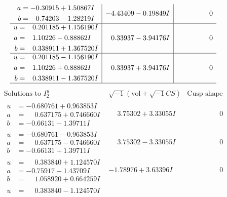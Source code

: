 \documentclass[1p]{elsarticle_modified}
\theoremstyle{definition}
\newcommand{\I}{\sqrt{-1}}
\begin{document}
$$\begin{array}{c|c|c}
\begin{aligned}
a &= -0.30915 + 1.50867 I \\
b &= -0.74203 - 1.28219 I\end{aligned}
 & -4.43409 - 0.19849 I & \phantom{-0.000000 } 0 \\ \hline\begin{aligned}
u &= \phantom{-}0.201185 + 1.156190 I \\
a &= \phantom{-}1.10226 - 0.88862 I \\
b &= \phantom{-}0.338911 + 1.367520 I\end{aligned}
 & \phantom{-}0.33937 - 3.94176 I & \phantom{-0.000000 } 0 \\ \hline\begin{aligned}
u &= \phantom{-}0.201185 - 1.156190 I \\
a &= \phantom{-}1.10226 + 0.88862 I \\
b &= \phantom{-}0.338911 - 1.367520 I\end{aligned}
 & \phantom{-}0.33937 + 3.94176 I & \phantom{-0.000000 } 0\\
 \hline 
 \end{array}$$\newpage$$\begin{array}{c|c|c}  
\text{Solutions to }I^u_{2}& \I (\text{vol} + \sqrt{-1}CS) & \text{Cusp shape}\\
 \hline 
\begin{aligned}
u &= -0.680761 + 0.963853 I \\
a &= \phantom{-}0.637175 + 0.746660 I \\
b &= -0.66131 - 1.39711 I\end{aligned}
 & \phantom{-}3.75302 + 3.33055 I & \phantom{-0.000000 } 0 \\ \hline\begin{aligned}
u &= -0.680761 - 0.963853 I \\
a &= \phantom{-}0.637175 - 0.746660 I \\
b &= -0.66131 + 1.39711 I\end{aligned}
 & \phantom{-}3.75302 - 3.33055 I & \phantom{-0.000000 } 0 \\ \hline\begin{aligned}
u &= \phantom{-}0.383840 + 1.124570 I \\
a &= -0.75917 - 1.43709 I \\
b &= \phantom{-}1.058920 + 0.664259 I\end{aligned}
 & -1.78976 + 3.63396 I & \phantom{-0.000000 } 0 \\ \hline\begin{aligned}
u &= \phantom{-}0.383840 - 1.124570 I \\

\end{aligned}
\end{array}$$
\end{document}
